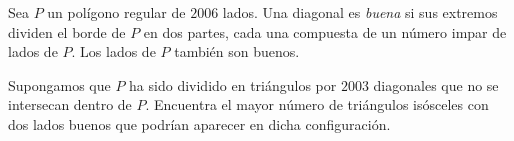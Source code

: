 Sea $P$ un polígono regular de $2006$ lados. Una diagonal es \emph{buena} si sus extremos dividen el borde de $P$ en dos partes, cada una compuesta de un número impar de lados de $P$. Los lados de $P$ también son buenos.  \newline 

Supongamos que $P$ ha sido dividido en triángulos por $2003$ diagonales que no se intersecan dentro de $P$. Encuentra el mayor número de triángulos isósceles con dos lados buenos que podrían aparecer en dicha configuración.